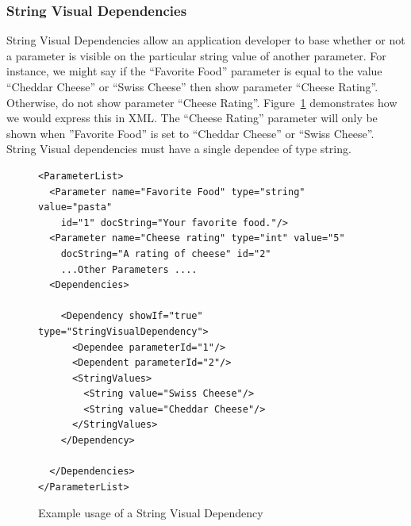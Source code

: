 \subsubsection{String Visual Dependencies}
String Visual Dependencies allow an application developer to base whether or not a parameter is visible on the particular string value of another
parameter. For instance, we might say if the ``Favorite Food'' parameter  is equal to the value ``Cheddar Cheese'' or ``Swiss Cheese'' then show parameter ``Cheese Rating''. 
Otherwise, do not show parameter ``Cheese Rating''. Figure~\ref{StringVisXML} demonstrates how we would express this in XML. The 
``Cheese Rating'' parameter will only be shown when ''Favorite Food'' is set to ``Cheddar Cheese'' or ``Swiss Cheese''. String Visual dependencies must have a single 
dependee of type string. 
\begin{figure}
\centering
{\footnotesize
\begin{Verbatim}
<ParameterList>
  <Parameter name="Favorite Food" type="string" value="pasta"
    id="1" docString="Your favorite food."/>
  <Parameter name="Cheese rating" type="int" value="5"
    docString="A rating of cheese" id="2"
    ...Other Parameters ....
  <Dependencies>

    <Dependency showIf="true" type="StringVisualDependency">
      <Dependee parameterId="1"/>
      <Dependent parameterId="2"/>
      <StringValues>
        <String value="Swiss Cheese"/>
        <String value="Cheddar Cheese"/>
      </StringValues>
    </Dependency>

  </Dependencies>
</ParameterList>
\end{Verbatim}
}
\caption{Example usage of a String Visual Dependency}
\label{StringVisXML}
\end{figure}


